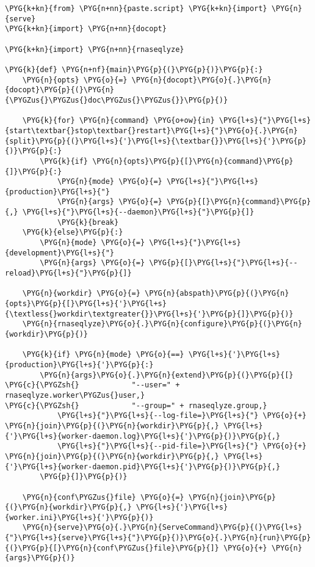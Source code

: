 \begin{Verbatim}[commandchars=\\\{\}]
\PYG{k+kn}{from} \PYG{n+nn}{paste.script} \PYG{k+kn}{import} \PYG{n}{serve}
\PYG{k+kn}{import} \PYG{n+nn}{docopt}

\PYG{k+kn}{import} \PYG{n+nn}{rnaseqlyze}

\PYG{k}{def} \PYG{n+nf}{main}\PYG{p}{(}\PYG{p}{)}\PYG{p}{:}
    \PYG{n}{opts} \PYG{o}{=} \PYG{n}{docopt}\PYG{o}{.}\PYG{n}{docopt}\PYG{p}{(}\PYG{n}{\PYGZus{}\PYGZus{}doc\PYGZus{}\PYGZus{}}\PYG{p}{)}

    \PYG{k}{for} \PYG{n}{command} \PYG{o+ow}{in} \PYG{l+s}{"}\PYG{l+s}{start\textbar{}stop\textbar{}restart}\PYG{l+s}{"}\PYG{o}{.}\PYG{n}{split}\PYG{p}{(}\PYG{l+s}{'}\PYG{l+s}{\textbar{}}\PYG{l+s}{'}\PYG{p}{)}\PYG{p}{:}
        \PYG{k}{if} \PYG{n}{opts}\PYG{p}{[}\PYG{n}{command}\PYG{p}{]}\PYG{p}{:}
            \PYG{n}{mode} \PYG{o}{=} \PYG{l+s}{"}\PYG{l+s}{production}\PYG{l+s}{"}
            \PYG{n}{args} \PYG{o}{=} \PYG{p}{[}\PYG{n}{command}\PYG{p}{,} \PYG{l+s}{"}\PYG{l+s}{--daemon}\PYG{l+s}{"}\PYG{p}{]}
            \PYG{k}{break}
    \PYG{k}{else}\PYG{p}{:}
        \PYG{n}{mode} \PYG{o}{=} \PYG{l+s}{"}\PYG{l+s}{development}\PYG{l+s}{"}
        \PYG{n}{args} \PYG{o}{=} \PYG{p}{[}\PYG{l+s}{"}\PYG{l+s}{--reload}\PYG{l+s}{"}\PYG{p}{]}

    \PYG{n}{workdir} \PYG{o}{=} \PYG{n}{abspath}\PYG{p}{(}\PYG{n}{opts}\PYG{p}{[}\PYG{l+s}{'}\PYG{l+s}{\textless{}workdir\textgreater{}}\PYG{l+s}{'}\PYG{p}{]}\PYG{p}{)}
    \PYG{n}{rnaseqlyze}\PYG{o}{.}\PYG{n}{configure}\PYG{p}{(}\PYG{n}{workdir}\PYG{p}{)}

    \PYG{k}{if} \PYG{n}{mode} \PYG{o}{==} \PYG{l+s}{'}\PYG{l+s}{production}\PYG{l+s}{'}\PYG{p}{:}
        \PYG{n}{args}\PYG{o}{.}\PYG{n}{extend}\PYG{p}{(}\PYG{p}{[}
\PYG{c}{\PYGZsh{}            "--user=" + rnaseqlyze.worker\PYGZus{}user,}
\PYG{c}{\PYGZsh{}            "--group=" + rnaseqlyze.group,}
            \PYG{l+s}{"}\PYG{l+s}{--log-file=}\PYG{l+s}{"} \PYG{o}{+} \PYG{n}{join}\PYG{p}{(}\PYG{n}{workdir}\PYG{p}{,} \PYG{l+s}{'}\PYG{l+s}{worker-daemon.log}\PYG{l+s}{'}\PYG{p}{)}\PYG{p}{,}
            \PYG{l+s}{"}\PYG{l+s}{--pid-file=}\PYG{l+s}{"} \PYG{o}{+} \PYG{n}{join}\PYG{p}{(}\PYG{n}{workdir}\PYG{p}{,} \PYG{l+s}{'}\PYG{l+s}{worker-daemon.pid}\PYG{l+s}{'}\PYG{p}{)}\PYG{p}{,}
        \PYG{p}{]}\PYG{p}{)}

    \PYG{n}{conf\PYGZus{}file} \PYG{o}{=} \PYG{n}{join}\PYG{p}{(}\PYG{n}{workdir}\PYG{p}{,} \PYG{l+s}{'}\PYG{l+s}{worker.ini}\PYG{l+s}{'}\PYG{p}{)}
    \PYG{n}{serve}\PYG{o}{.}\PYG{n}{ServeCommand}\PYG{p}{(}\PYG{l+s}{"}\PYG{l+s}{serve}\PYG{l+s}{"}\PYG{p}{)}\PYG{o}{.}\PYG{n}{run}\PYG{p}{(}\PYG{p}{[}\PYG{n}{conf\PYGZus{}file}\PYG{p}{]} \PYG{o}{+} \PYG{n}{args}\PYG{p}{)}
\end{Verbatim}


